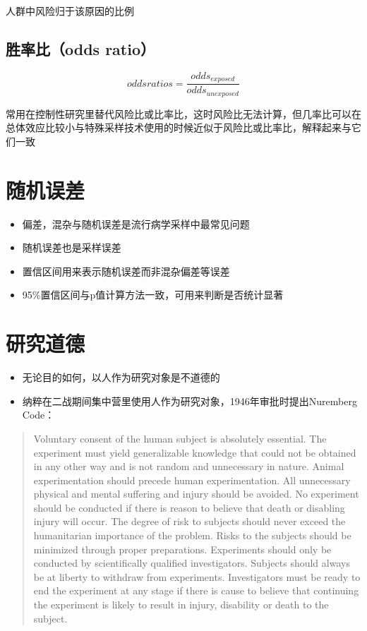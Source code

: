 \documentclass[]{book}
\providecommand{\tightlist}{%
  \setlength{\itemsep}{0pt}\setlength{\parskip}{0pt}}
\begin{document}
人群中风险归于该原因的比例

\hypertarget{odds-ratio}{%
\subsection{胜率比（odds ratio）}\label{odds-ratio}}

\[odds ratios = \frac{odds_{exposed}}{odds_{unexposed}}\]

常用在控制性研究里替代风险比或比率比，这时风险比无法计算，但几率比可以在总体效应比较小与特殊采样技术使用的时候近似于风险比或比率比，解释起来与它们一致

\section{随机误差}

\begin{itemize}
\tightlist
\item
  偏差，混杂与随机误差是流行病学采样中最常见问题
\item
  随机误差也是采样误差
\item
  置信区间用来表示随机误差而非混杂偏差等误差
\item
  95\%置信区间与p值计算方法一致，可用来判断是否统计显著
\end{itemize}

\section{研究道德}

\begin{itemize}
\tightlist
\item
  无论目的如何，以人作为研究对象是不道德的
\item
  纳粹在二战期间集中营里使用人作为研究对象，1946年审批时提出Nuremberg Code：
\end{itemize}

\begin{quote}
Voluntary consent of the human subject is absolutely essential.
The experiment must yield generalizable knowledge that could not be obtained in any other way and is not random and unnecessary in nature.
Animal experimentation should precede human experimentation.
All unnecessary physical and mental suffering and injury should be avoided.
No experiment should be conducted if there is reason to believe that death or disabling injury will occur.
The degree of risk to subjects should never exceed the humanitarian importance of the problem.
Risks to the subjects should be minimized through proper preparations.
Experiments should only be conducted by scientifically qualified investigators.
Subjects should always be at liberty to withdraw from experiments.
Investigators must be ready to end the experiment at any stage if there is cause to believe that continuing the experiment is likely to result in injury, disability or death to the subject.
\end{quote}
\end{document}
